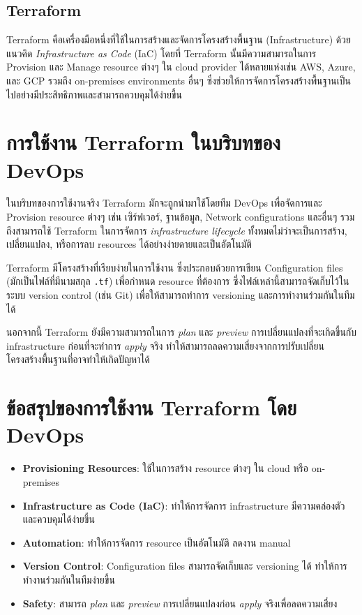 \subsection{Terraform}
Terraform คือเครื่องมือหนึ่งที่ใช้ในการสร้างและจัดการโครงสร้างพื้นฐาน (Infrastructure) ด้วยแนวคิด \textit{Infrastructure as Code} (IaC) โดยที่ Terraform นั้นมีความสามารถในการ Provision และ Manage resource ต่างๆ ใน cloud provider ได้หลายแห่งเช่น AWS, Azure, และ GCP รวมถึง on-premises environments อื่นๆ ซึ่งช่วยให้การจัดการโครงสร้างพื้นฐานเป็นไปอย่างมีประสิทธิภาพและสามารถควบคุมได้ง่ายขึ้น

\section*{การใช้งาน Terraform ในบริบทของ DevOps}
ในบริบทของการใช้งานจริง Terraform มักจะถูกนำมาใช้โดยทีม DevOps เพื่อจัดการและ Provision resource ต่างๆ เช่น เซิร์ฟเวอร์, ฐานข้อมูล, Network configurations และอื่นๆ รวมถึงสามารถใช้ Terraform ในการจัดการ \textit{infrastructure lifecycle} ทั้งหมดไม่ว่าจะเป็นการสร้าง, เปลี่ยนแปลง, หรือการลบ resources ได้อย่างง่ายดายและเป็นอัตโนมัติ

Terraform มีโครงสร้างที่เรียบง่ายในการใช้งาน ซึ่งประกอบด้วยการเขียน Configuration files (มักเป็นไฟล์ที่มีนามสกุล \texttt{.tf}) เพื่อกำหนด resource ที่ต้องการ ซึ่งไฟล์เหล่านี้สามารถจัดเก็บไว้ในระบบ version control (เช่น Git) เพื่อให้สามารถทำการ versioning และการทำงานร่วมกันในทีมได้

นอกจากนี้ Terraform ยังมีความสามารถในการ \textit{plan} และ \textit{preview} การเปลี่ยนแปลงที่จะเกิดขึ้นกับ infrastructure ก่อนที่จะทำการ \textit{apply} จริง ทำให้สามารถลดความเสี่ยงจากการปรับเปลี่ยนโครงสร้างพื้นฐานที่อาจทำให้เกิดปัญหาได้

\section*{ข้อสรุปของการใช้งาน Terraform โดย DevOps}
\begin{itemize}
    \item \textbf{Provisioning Resources}: ใช้ในการสร้าง resource ต่างๆ ใน cloud หรือ on-premises
    \item \textbf{Infrastructure as Code (IaC)}: ทำให้การจัดการ infrastructure มีความคล่องตัวและควบคุมได้ง่ายขึ้น
    \item \textbf{Automation}: ทำให้การจัดการ resource เป็นอัตโนมัติ ลดงาน manual
    \item \textbf{Version Control}: Configuration files สามารถจัดเก็บและ versioning ได้ ทำให้การทำงานร่วมกันในทีมง่ายขึ้น
    \item \textbf{Safety}: สามารถ \textit{plan} และ \textit{preview} การเปลี่ยนแปลงก่อน \textit{apply} จริงเพื่อลดความเสี่ยง
\end{itemize}